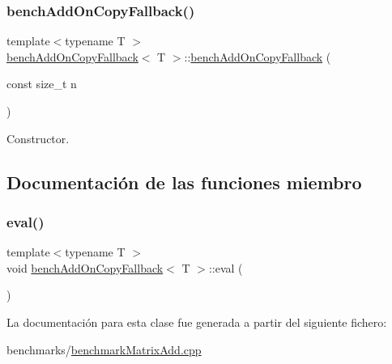 \subsubsection{\texorpdfstring{bench\+Add\+On\+Copy\+Fallback()}{benchAddOnCopyFallback()}}
{\footnotesize\ttfamily template$<$typename T $>$ \\
\hyperlink{classbenchAddOnCopyFallback}{bench\+Add\+On\+Copy\+Fallback}$<$ T $>$\+::\hyperlink{classbenchAddOnCopyFallback}{bench\+Add\+On\+Copy\+Fallback} (\begin{DoxyParamCaption}\item[{const size\+\_\+t}]{n }\end{DoxyParamCaption})\hspace{0.3cm}{\ttfamily [inline]}}



Constructor. 



\subsection{Documentación de las funciones miembro}
\mbox{\label{classbenchAddOnCopyFallback_a7b49d3f29f7854698f3867a410af40b8}} 
\subsubsection{\texorpdfstring{eval()}{eval()}}
{\footnotesize\ttfamily template$<$typename T $>$ \\
void \hyperlink{classbenchAddOnCopyFallback}{bench\+Add\+On\+Copy\+Fallback}$<$ T $>$\+::eval (\begin{DoxyParamCaption}{ }\end{DoxyParamCaption})\hspace{0.3cm}{\ttfamily [inline]}}



La documentación para esta clase fue generada a partir del siguiente fichero\+:\begin{DoxyCompactItemize}
\item 
benchmarks/\hyperlink{benchmarkMatrixAdd_8cpp}{benchmark\+Matrix\+Add.\+cpp}\end{DoxyCompactItemize}
